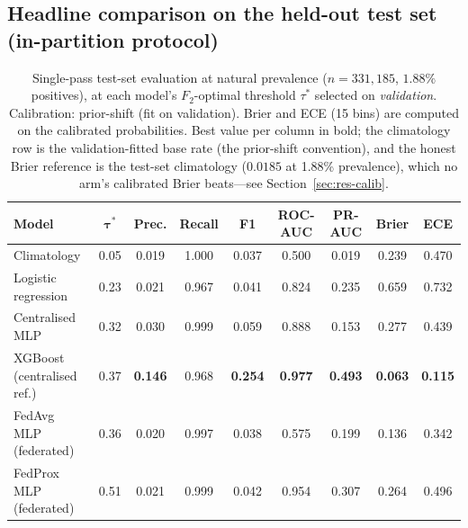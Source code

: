 \subsection{Headline comparison on the held-out test set (in-partition protocol)}

\begin{table}[t]
\centering
\caption{Single-pass test-set evaluation at natural prevalence
($n{=}331{,}185$, $1.88\%$ positives), at each model's
$F_2$-optimal threshold $\tau^\ast$ selected on \emph{validation}.
Calibration: prior-shift (fit on validation). Brier and ECE (15 bins)
are computed on the calibrated probabilities. Best value per column in
bold; the climatology row is the validation-fitted base rate (the
prior-shift convention), and the honest Brier reference is the
test-set climatology ($0.0185$ at 1.88\% prevalence), which no arm's
calibrated Brier beats---see Section~\ref{sec:res-calib}.}
\label{tab:main}
\footnotesize
\setlength{\tabcolsep}{2.8pt}
\begin{tabularx}{\textwidth}{@{}>{\raggedright\arraybackslash}X c c c c c c c c@{}}
\toprule
\textbf{Model} & $\boldsymbol{\tau^\ast}$ & \textbf{Prec.} &
\textbf{Recall} & \textbf{F1} & \textbf{ROC-AUC} & \textbf{PR-AUC} &
\textbf{Brier} & \textbf{ECE} \\
\midrule
Climatology & 0.05 & 0.019 & 1.000 & 0.037 & 0.500 & 0.019 & 0.239 & 0.470 \\
Logistic regression & 0.23 & 0.021 & 0.967 & 0.041 & 0.824 & 0.235 & 0.659 & 0.732 \\
Centralised MLP & 0.32 & 0.030 & 0.999 & 0.059 & 0.888 & 0.153 & 0.277 & 0.439 \\
XGBoost (centralised ref.) & 0.37 & \textbf{0.146} & 0.968 &
\textbf{0.254} & \textbf{0.977} & \textbf{0.493} & \textbf{0.063} &
\textbf{0.115} \\
FedAvg MLP (federated) & 0.36 & 0.020 & 0.997 & 0.038 & 0.575 & 0.199 & 0.136 & 0.342 \\
FedProx MLP (federated) & 0.51 & 0.021 & 0.999 & 0.042 & 0.954 & 0.307 & 0.264 & 0.496 \\
\bottomrule
\end{tabularx}
\end{table}

